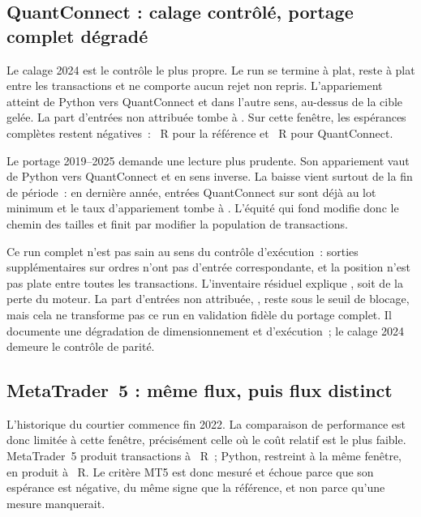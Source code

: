 \subsection{QuantConnect : calage contrôlé, portage complet dégradé}

Le calage 2024 est le contrôle le plus propre. Le run se termine à plat,
reste à plat entre les transactions et ne comporte aucun rejet non repris.
L'appariement atteint \XTenQCMatchRate{} de Python vers QuantConnect et
\XTenQCMatchRateReverse{} dans l'autre sens, au-dessus de la cible gelée.
La part d'entrées non attribuée tombe à \XTenQCUnattributed. Sur cette fenêtre,
les espérances complètes restent négatives~: \XTenPyExpectancyRQC{}~R pour la
référence et \XTenQCExpectancyR{}~R pour QuantConnect.

Le portage 2019--2025 demande une lecture plus prudente. Son appariement vaut
\XTenQCMatchRateFull{} de Python vers QuantConnect et
\XTenQCMatchRateFullReverse{} en sens inverse. La baisse vient surtout de la
fin de période~: en dernière année, \XTenQCLotFloorLastYear{} entrées
QuantConnect sur \XTenQCTradesLastYear{} sont déjà au lot minimum et le taux
d'appariement tombe à \XTenQCMatchRateLastYear. L'équité qui fond modifie donc
le chemin des tailles et finit par modifier la population de transactions.



Ce run complet n'est pas sain au sens du contrôle d'exécution~:
\XTenQCDuplicateOrders{} sorties supplémentaires sur \XTenQCOrders{} ordres
n'ont pas d'entrée correspondante, et la position n'est pas plate entre toutes
les transactions. L'inventaire
résiduel explique \XTenQCDuplicateUsd, soit \XTenQCDuplicateLossShare{} de la
perte du moteur. La part d'entrées non attribuée, \XTenQCUnattributedFull,
reste sous le seuil de blocage, mais cela ne transforme pas ce run en
validation fidèle du portage complet. Il documente une dégradation de
dimensionnement et d'exécution~; le calage 2024 demeure le contrôle de parité.

\subsection{MetaTrader~5 : même flux, puis flux distinct}

L'historique du courtier commence fin 2022. La comparaison de performance est
donc limitée à cette fenêtre, précisément celle où le coût relatif est le plus
faible. MetaTrader~5 produit \XTenMTFiveTrades{} transactions à
\XTenMTFiveExpectancyR{}~R~; Python, restreint à la même fenêtre, en produit
\XTenPySameWindowTrades{} à \XTenPySameWindowExpectancyR{}~R. Le critère MT5
est donc mesuré et échoue parce que son espérance est négative, du même signe
que la référence, et non parce qu'une mesure manquerait.

